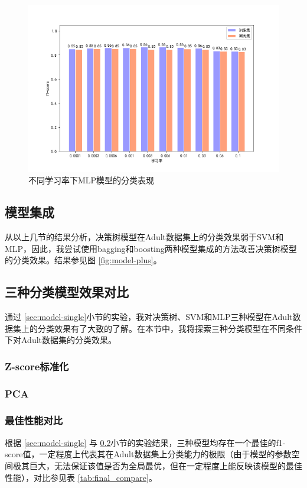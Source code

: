 \documentclass[12pt,a4paper]{article}
\theoremstyle{definition}
\begin{document}
\begin{figure}[H]
	\centering
	\includegraphics[width=0.75\linewidth]{img/mlp_lr.png}
	\caption{不同学习率下MLP模型的分类表现}
	\label{fig:lr}
\end{figure}

\subsection{模型集成}

从以上几节的结果分析，决策树模型在Adult数据集上的分类效果弱于SVM和MLP，因此，我尝试使用bagging和boosting两种模型集成的方法改善决策树模型的分类效果。结果参见图 \ref{fig:model-plus}。

\subsection{三种分类模型效果对比}
\label{sec:compare}

通过 \ref{sec:model-single}小节的实验，我对决策树、SVM和MLP三种模型在Adult数据集上的分类效果有了大致的了解。在本节中，我将探索三种分类模型在不同条件下对Adult数据集的分类效果。

\subsubsection{Z-score标准化}

\subsubsection{PCA}

\subsubsection{最佳性能对比}

根据 \ref{sec:model-single} 与 \ref{sec:compare}小节的实验结果，三种模型均存在一个最佳的f1-score值，一定程度上代表其在Adult数据集上分类能力的极限（由于模型的参数空间极其巨大，无法保证该值是否为全局最优，但在一定程度上能反映该模型的最佳性能），对比参见表 \ref{tab:final_compare}。
\end{document}
